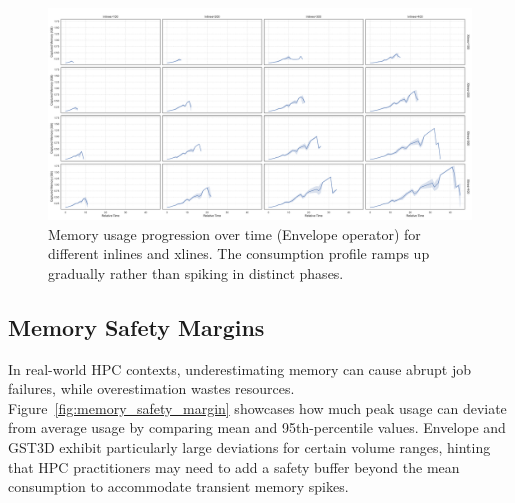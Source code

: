 \begin{figure}[htbp]
    \centering
    \includegraphics[width=\textwidth]{assets/images/05/inline_xline_memory_usage_progression_envelope}
    \caption{Memory usage progression over time (Envelope operator) for different inlines and xlines. The consumption profile ramps up gradually rather than spiking in distinct phases.}
    \label{fig:inline_xline_memory_usage_progression_envelope}
\end{figure}

\subsection{Memory Safety Margins}
\label{subsec:memory-safety-margins}

In real-world \ac{HPC} contexts, underestimating memory can cause abrupt job failures, while overestimation wastes resources.
Figure~\ref{fig:memory_safety_margin} showcases how much peak usage can deviate from average usage by comparing mean and 95th-percentile values.
Envelope and \ac{GST3D} exhibit particularly large deviations for certain volume ranges, hinting that HPC practitioners may need to add a safety buffer beyond the mean consumption to accommodate transient memory spikes.

